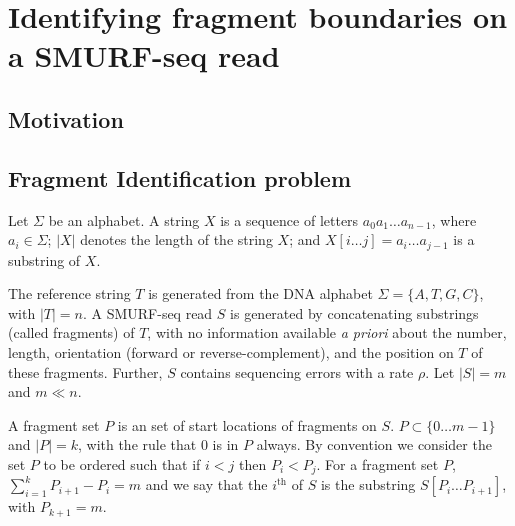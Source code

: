 
\chapter{Identifying fragment boundaries on a SMURF-seq read}
\label{ch4}

\section{Motivation}


\section{Fragment Identification problem}
Let $\Sigma$ be an alphabet. A string $X$ is a sequence of letters $a_0
a_1 \dots a_{n-1}$, where $a_i \in \Sigma$; $|X|$ denotes the length of
the string $X$; and $X[i \dots j] = a_i \dots a_{j-1}$ is a substring of
$X$.

The reference string $T$ is generated from the DNA alphabet $\Sigma =
\{A, T, G, C\}$, with $|T| = n$.
A SMURF-seq read $S$ is generated by concatenating substrings (called
fragments) of $T$, with no information available \textit{a priori} about
the number, length, orientation (forward or reverse-complement), and the
position on $T$ of these fragments.  Further, $S$ contains sequencing
errors with a rate $\rho$. Let $|S| = m$ and $m \ll n$.

A fragment set $P$ is an set of start locations of fragments on $S$. $P
\subset \{0 \dots m-1\}$ and $|P| = k$, with the rule that $0$ is in $P$
always.
By convention we consider the set $P$ to be ordered such that if $i < j$
then $P_i < P_j$.
For a fragment set $P$, $\sum_{i = 1}^{k} P_{i+1} - P_i = m$ and we say
that the $i^{\text{th}}$ of $S$ is the substring $S[P_i \dots P_{i+1}]$,
with $P_{k+1} = m$.

